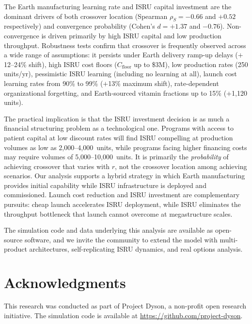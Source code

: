 \documentclass[preprint,12pt]{elsarticle}
\begin{document}
The Earth manufacturing learning rate and ISRU capital investment are the dominant drivers of both crossover location (Spearman $\rho_S = -0.66$ and $+0.52$ respectively) and convergence probability (Cohen's $d = +1.37$ and $-0.76$). Non-convergence is driven primarily by high ISRU capital and low production throughput. Robustness tests confirm that crossover is frequently observed across a wide range of assumptions: it persists under Earth delivery ramp-up delays ($+$12--24\% shift), high ISRU cost floors ($C_{\mathrm{floor}}$ up to \$3M), low production rates (250 units/yr), pessimistic ISRU learning (including no learning at all), launch cost learning rates from 90\% to 99\% ($+$13\% maximum shift), rate-dependent organizational forgetting, and Earth-sourced vitamin fractions up to 15\% ($+$1{,}120 units).

The practical implication is that the ISRU investment decision is as much a financial structuring problem as a technological one. Programs with access to patient capital at low discount rates will find ISRU compelling at production volumes as low as 2{,}000--4{,}000~units, while programs facing higher financing costs may require volumes of 5{,}000--10{,}000~units. It is primarily the \emph{probability} of achieving crossover that varies with $r$, not the crossover location among achieving scenarios. Our analysis supports a hybrid strategy in which Earth manufacturing provides initial capability while ISRU infrastructure is deployed and commissioned. Launch cost reduction and ISRU investment are complementary pursuits: cheap launch accelerates ISRU deployment, while ISRU eliminates the throughput bottleneck that launch cannot overcome at megastructure scales.

The simulation code and data underlying this analysis are available as open-source software, and we invite the community to extend the model with multi-product architectures, self-replicating ISRU dynamics, and real options analysis.


\section*{Acknowledgments}

This research was conducted as part of Project Dyson, a non-profit open research initiative. The simulation code is available at \url{https://github.com/project-dyson}.
\end{document}
